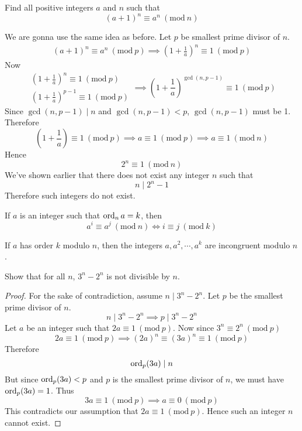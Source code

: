 \documentclass[11pt,numbers=noenddot,svgnames,dvipsnames]{scrartcl}
\renewcommand{\pmod}[1]{\ (\mathrm{mod}\ #1)}
\begin{document}
\begin{problem}
    Find all positive integers $a$ and $n$ such that 
    \[
        (a+1)^{n}\equiv a^{n}\pmod n
    \]
\end{problem}
\begin{sol}
    We are gonna use the same idea as before. Let $p$ be smallest prime divisor of $n$. 
    \begin{align*}
                 (a+1)^n \equiv a^n \pmod p 
        \implies \left(1 + \frac{1}{a}\right)^n \equiv 1 \pmod p
    \end{align*}
    Now 
    \begin{equation*}
        \begin{matrix}
            \left(1 + \frac{1}{a}\right)^{n}   \equiv 1 \pmod p\\
            \left(1 + \frac{1}{a}\right)^{p-1} \equiv 1 \pmod p
        \end{matrix}
        \implies 
        \left(1 + \frac{1}{a}\right)^{\gcd(n, p-1)} \equiv 1\pmod p
    \end{equation*}
    Since $\gcd(n,p-1)\mid n$ and $\gcd(n,p-1) < p$, $\gcd(n,p-1)$ must be 1. 
    Therefore 
    \[
        \left(1 + \frac{1}{a}\right) \equiv 1 \pmod p 
        \implies a \equiv 1 \pmod p 
        \implies a \equiv 1 \pmod n
    \]
    Hence 
    \[
        2^{n} \equiv 1 \pmod n
    \]
    We've shown earlier that there does not exist any integer $n$ such that 
    \[
        n \mid 2^{n} - 1
    \]
    Therefore such integers do not exist.
\end{sol}

\begin{theorem}
    If $a$ is an integer such that $\operatorname{ord}_{n} a = k$, then 
    \[
        a^{i} \equiv a^{j} \pmod n \iff i \equiv j \pmod k
    \]
\end{theorem}

\begin{corollary}
    If $a$ has order $k$ modulo $n$, then the integers $a, a^{2}, \cdots, a^{k}$ 
    are incongruent modulo $n$.
\end{corollary}

\begin{example}
    Show that for all $n$, $3^{n} - 2^{n}$ is not divisible by $n$.
\end{example}
\begin{proof}
    For the sake of contradiction, assume $n\mid 3^{n} - 2^{n}$. Let $p$ be the smallest 
    prime divisor of $n$. 
    \[
        n \mid 3^{n} - 2^{n} \implies p \mid 3^{n} - 2^{n}
    \]
    Let $a$ be an integer such that $2a \equiv 1 \pmod p$. Now since $3^{n} \equiv 2^{n} \pmod p$ 
    \[
        2a \equiv 1 \pmod p \implies (2a)^{n} \equiv (3a)^{n} \equiv 1 \pmod p
    \]
    Therefore 
    \[
        \operatorname{ord}_{p}(3a) \mid n
    \]
    But since $\operatorname{ord}_{p}(3a) < p$ and $p$ is the smallest prime divisor of $n$, we must have 
    $\operatorname{ord}_{p}(3a) = 1$. Thus 
    \[
        3a \equiv 1 \pmod p \implies a \equiv 0 \pmod p
    \]
    This contradicts our assumption that $2a \equiv 1 \pmod p$. Hence such an integer $n$ cannot exist.
\end{proof}
\end{document}
